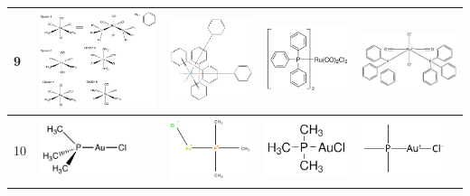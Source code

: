\begin{landscape}
\begin{longtable}{m{0.3cm}
                >{\centering}m{4.8cm}
                >{\centering}m{4.8cm}
                >{\centering}m{4.8cm}
                >{\centering\arraybackslash}m{4.8cm}}
 9 &
 \includegraphics[width=4.2cm]{imagenes/resultados/anexo_expertos/mol9.png} & 
 \includegraphics[width=3cm]{imagenes/resultados/anexo_expertos/mol9_openbabel.png} & 
 \includegraphics[width=3cm]{imagenes/sigmaAldrich/Bis(triphenylphosphine)ruthenium(II) dicarbonyl chloride.jpeg} & 
 \includegraphics[width=3.4cm]{imagenes/sciFinder/pdf/Bis(triphenylphosphine)ruthenium(II) dicarbonyl chloride.pdf} \\
\midrule

 10 &
 \includegraphics[width=2.7cm]{imagenes/resultados/anexo_expertos/mol10.png} & 
 \includegraphics[width=2.7cm]{imagenes/resultados/anexo_expertos/mol10_openbabel.png} & 
 \includegraphics[width=2.5cm]{imagenes/sigmaAldrich/Chloro(trimethylphosphine)gold(I).png} & 
 \includegraphics[width=2.5cm]{imagenes/sciFinder/pdf/Chloro(trimethylphosphine)gold(I).pdf} \\
\midrule



\end{longtable}
\end{landscape}
